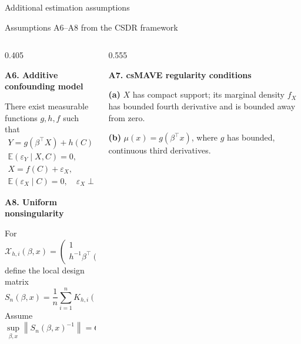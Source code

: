 \documentclass[
  ignorenonframetext,
  aspectratio=169,
  11pt]{beamer}
\begin{document}
\begin{frame}{Additional estimation assumptions}
\label{additional-estimation-assumptions}
\vspace{-0.43cm}

\begin{block}{Assumptions A6--A8 from the CSDR framework}
\begin{minipage}[t][5.48cm][t]{\linewidth}
\fontsize{6.5}{7.7}\selectfont
\setlength{\parskip}{0pt}
\setlength{\abovedisplayskip}{2.5pt}
\setlength{\belowdisplayskip}{2.5pt}
\setlength{\abovedisplayshortskip}{2pt}
\setlength{\belowdisplayshortskip}{2pt}

\vspace{0.08cm}
\begin{columns}[T,onlytextwidth]
\begin{column}{0.405\linewidth}
\raggedright
\textbf{\textcolor{emoryblue}{A6. Additive confounding model}}\par
There exist measurable functions \(g,h,f\) such that
\[
\begin{gathered}
Y=g(\beta^\top X)+h(C)+\varepsilon_Y,\\[-1pt]
\mathbb E(\varepsilon_Y\mid X,C)=0,\\[1pt]
X=f(C)+\varepsilon_X,\\[-1pt]
\mathbb E(\varepsilon_X\mid C)=0,\quad
\varepsilon_X\perp\!\!\!\perp C .
\end{gathered}
\]

\vspace{0.10cm}
\textbf{\textcolor{emoryblue}{A8. Uniform nonsingularity}}\par
For
\[
\mathcal X_{h,i}(\beta,x)=
\begin{pmatrix}
1\\ h^{-1}\beta^\top(X_i-x)
\end{pmatrix},
\]
define the local design matrix
\[
S_n(\beta,x)=\frac1n\sum_{i=1}^n
K_{h,i}(x)\,
\mathcal X_{h,i}(\beta,x)
\mathcal X_{h,i}(\beta,x)^\top .
\]
Assume
\[
\sup_{\beta,x}\left\|S_n(\beta,x)^{-1}\right\|=O_p(1).
\]
\end{column}

\begin{column}{0.555\linewidth}
\raggedright
\textbf{\textcolor{emoryblue}{A7. csMAVE regularity conditions}}\par
\textbf{(a)} \(X\) has compact support; its marginal density \(f_X\)
has bounded fourth derivative and is bounded away from zero.

\vspace{0.07cm}
\textbf{(b)} \(\mu(x)=g(\beta^\top x)\), where \(g\) has bounded,
continuous third derivatives.


\end{column}
\end{columns}
\end{minipage}
\end{block}
\end{frame}
\end{document}
